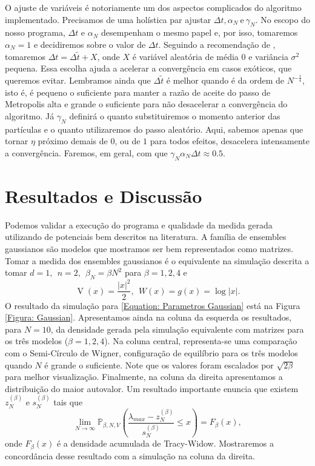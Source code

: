 \documentclass[11pt,twocolumn]{article}
\DeclareMathOperator{\V}{V}
\numberwithin{equation}{section} %
\begin{document}
O ajuste de variáveis é notoriamente um dos aspectos complicados do algoritmo implementado. Precisamos de uma holística par ajustar $\Delta t, \alpha_N \ \text{e} \ \gamma_N$. No escopo do nosso programa, $\Delta t$ e $\alpha_N$ desempenham o mesmo papel e, por isso, tomaremos $\alpha_N = 1$ e decidiremos sobre o valor de $\Delta t$. Seguindo a recomendação de \cite[Capítulo~5]{handbookmontecarlo}, tomaremos $\Delta t = \Delta\tilde{t} + X$, onde $X$ é variável aleatória de média $0$ e variância $\sigma^2$ pequena. Essa escolha ajuda a acelerar a convergência em casos exóticos, que queremos evitar. Lembramos ainda que $\Delta \tilde{t}$ é melhor quando é da ordem de $N^{-\frac{1}{4}}$, isto é, é pequeno o suficiente para manter a razão de aceite do passo de Metropolis alta e grande o suficiente para não desacelerar a convergência do algoritmo. Já $\gamma_N$ definirá o quanto substituiremos o momento anterior das partículas e o quanto utilizaremos do passo aleatório. Aqui, sabemos apenas que tornar $\eta$ próximo demais de $0$, ou de $1$ para todos efeitos, desacelera intensamente a convergência. Faremos, em geral, com que $\gamma_N \alpha_N \Delta t \approx 0.5$.

\section{Resultados e Discussão}

Podemos validar a execução do programa e qualidade da medida gerada utilizando de potenciais bem descritos na literatura. A família de ensembles gaussianos são modelos que mostramos ser bem representados como matrizes. Tomar a medida dos ensembles gaussianos é o equivalente na simulação descrita a tomar $d = 1, \ \  n = 2, \ \ \beta_N = \beta N^2$ para $\beta = 1,2,4$ e 
\begin{equation}
	\V(x)=\frac{|x|^2}{2}, \ \ W(x) = g(x) = \log{|x|}.
	\label{Equation: Parametros Gaussian}
\end{equation}
O resultado da simulação para \ref{Equation: Parametros Gaussian} está na Figura \ref{Figura: Gaussian}. Apresentamos ainda na coluna da esquerda os resultados, para $N=10$, da densidade gerada pela simulação equivalente com matrizes para os três modelos ($\beta = 1,2,4$). Na coluna central, representa-se uma comparação com o Semi-Círculo de Wigner, configuração de equilíbrio para os três modelos quando $N$ é grande o suficiente. Note que os valores foram escalados por $\sqrt{2 \beta}$ para melhor visualização. Finalmente, na coluna da direita apresentamos a distribuição do maior autovalor. Um resultado importante  \cite{Tracy} enuncia que existem $z_{N}^{(\beta)}$ e $s_N^{(\beta)}$ tais que $$\lim_{N \to \infty} \mathbb{P}_{\beta,N,V} \left( \frac{\lambda_{max} - z_{N}^{(\beta)}}{s_N^{(\beta)}} \leq x \right) = F_{\beta}(x),$$ onde $F_{\beta}(x)$ é a densidade acumulada de Tracy-Widow. Mostraremos a concordância desse resultado com a simulação na coluna da direita.
\end{document}
